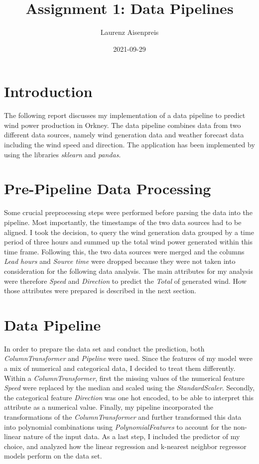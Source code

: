 \documentclass[12pt, a4paper]{article}
\title{Assignment 1: Data Pipelines}
\author{Laurenz Aisenpreis}
\date{2021-09-29}
\begin{document}
\maketitle

\section{Introduction}

The following report discusses my implementation of a data pipeline to predict wind power production in Orkney. The data pipeline combines data from two different data sources, namely wind generation data and weather forecast data including the wind speed and direction.  
The application has been implemented by using the libraries \emph{sklearn} and \emph{pandas}.

\section{Pre-Pipeline Data Processing}

Some crucial preprocessing steps were performed before parsing the data into the pipeline. Most importantly, the timestamps of the two data sources had to be aligned. I took the decision, to query the wind generation data grouped by a time period of three hours and summed up the total wind power generated within this time frame.
Following this, the two data sources were merged and the columns \emph{Lead hours} and \emph{Source time} were dropped because they were not taken into consideration for the following data analysis. The main attributes for my analysis were therefore \emph{Speed} and \emph{Direction} to predict the \emph{Total} of generated wind. How those attributes were prepared is described in the next section.

\section{Data Pipeline}

In order to prepare the data set and conduct the prediction, both \emph{ColumnTransformer} and \emph{Pipeline} were used. Since the features of my model were a mix of numerical and categorical data, I decided to treat them differently. Within a \emph{ColumnTransformer}, first the missing values of the numerical feature \emph{Speed} were replaced by the median and scaled using the \emph{StandardScaler}. Secondly, the categorical feature \emph{Direction} was one hot encoded, to be able to interpret this attribute as a numerical value. \newline
Finally, my pipeline incorporated the transformations of the \emph{ColumnTransformer} and further transformed this data into polynomial combinations using \emph{PolynomialFeatures} to account for the non-linear nature of the input data. As a last step, I included the predictor of my choice, and analyzed how the linear regression and k-nearest neighbor regressor models perform on the data set.
\end{document}
